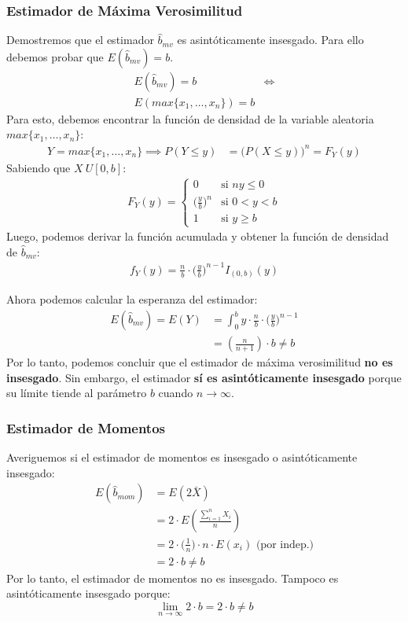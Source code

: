 \subsubsection{Estimador de Máxima Verosimilitud}
Demostremos que el estimador $\hat{b}_{mv}$ es asintóticamente insesgado. Para ello debemos probar que $E(\hat{b}_{mv}) = b$.
\begin{align*}
	E(\hat{b}_{mv}) = b &\iff \\
	E(max\{x_1, \dots, x_n\}) = b
\end{align*}
Para esto, debemos encontrar la función de densidad de la variable aleatoria $max\{x_1, \dots, x_n\}$:
\begin{align*}
	Y = max\{x_1, \dots, x_n\} \implies P(Y \leq y) &= \Big( P(X \leq y) \Big)^n = F_{Y}(y)
\end{align*}
Sabiendo que $X~U[0, b]$:
\begin{align*}
	F_{Y}(y) = 
	\begin{cases}
		0 						&\mbox{si } n y \leq 0 \\
		\Big(\frac{y}{b}\Big)^n & \mbox{si } 0 < y < b \\
		1 						& \mbox{si } y \geq b
	\end{cases}
\end{align*}
Luego, podemos derivar la función acumulada y obtener la función de densidad de $\hat{b}_{mv}$:
\begin{align*}
	f_{Y}(y) = \frac{n}{b} \cdot \Big(\frac{y}{b}\Big)^{n - 1} I_{(0, b)}(y)
\end{align*}

Ahora podemos calcular la esperanza del estimador:
\begin{align*}
	E(\hat{b}_{mv}) = E(Y) 	&= \int_{0}^{b}y \cdot \frac{n}{b} \cdot \Big(\frac{y}{b}\Big)^{n - 1} \\
							&= (\frac{n}{n+1}) \cdot b \neq b
\end{align*}
Por lo tanto, podemos concluir que el estimador de máxima verosimilitud \textbf{no es insesgado}. Sin embargo, el estimador \textbf{sí es asintóticamente insesgado} porque su límite tiende al parámetro $b$ cuando $n \rightarrow \infty$.

\subsubsection{Estimador de Momentos}
Averiguemos si el estimador de momentos es insesgado o asintóticamente insesgado:
\begin{align*}
	E(\hat{b}_{mom}) &= E(2\bar{X}) \\
	 	 			 &= 2 \cdot E(\frac{\sum_{i=1}^{n}X_{i}}{n}) \\
	 	 			 &= 2 \cdot \Big(\frac{1}{n}\Big) \cdot n \cdot E(x_{i}) \text{ (por indep.)}\\
	 	 			 &= 2 \cdot b \neq b
\end{align*}
Por lo tanto, el estimador de momentos no es insesgado. Tampoco es asintóticamente insesgado porque:
\begin{displaymath}
\lim_{n \to \infty} 2 \cdot b = 2 \cdot b \neq b
\end{displaymath}

